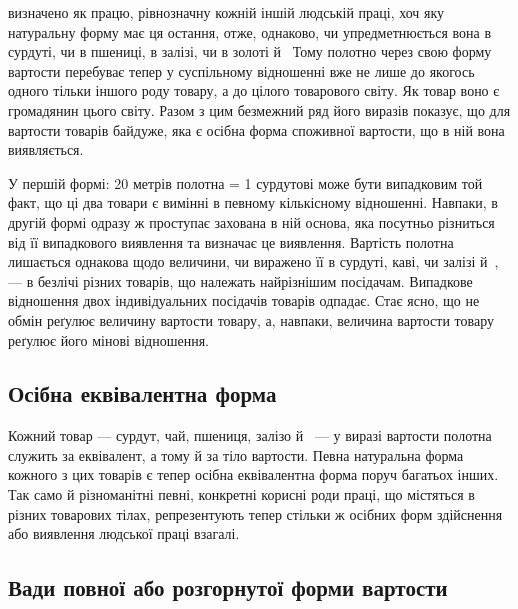 \parcont{}  %
визначено як працю, рівнозначну кожній іншій людській праці,
хоч яку натуральну форму має ця остання, отже, однаково, чи
упредметнюється вона в сурдуті, чи в пшениці, в залізі, чи в
золоті й~ Тому полотно через свою форму вартости перебуває
тепер у суспільному відношенні вже не лише до якогось одного
тільки іншого роду товару, а до цілого товарового світу. Як
товар воно є громадянин цього світу. Разом з цим безмежний ряд
його виразів показує, що для вартости товарів байдуже, яка є
осібна форма споживної вартости, що в ній вона виявляється.

У першій формі: 20 метрів полотна = 1 сурдутові може бути
випадковим той факт, що ці два товари є вимінні в певному кількісному
відношенні. Навпаки, в другій формі одразу ж проступає
захована в ній основа, яка посутньо різниться від її випадкового
виявлення та визначає це виявлення. Вартість полотна лишається
однакова щодо величини, чи виражено її в сурдуті, каві, чи
залізі й~, — в безлічі різних товарів, що належать найрізнішим
посідачам. Випадкове відношення двох індивідуальних посідачів
товарів одпадає. Стає ясно, що не обмін реґулює величину
вартости товару, а, навпаки, величина вартости товару реґулює
його мінові відношення.

\subsection{Осібна еквівалентна форма}

Кожний товар — сурдут, чай, пшениця, залізо й~ — у
виразі вартости полотна служить за еквівалент, а тому й за тіло
вартости. Певна натуральна форма кожного з цих товарів є тепер
осібна еквівалентна форма поруч багатьох інших. Так само й
різноманітні певні, конкретні корисні роди праці, що містяться
в різних товарових тілах, репрезентують тепер стільки ж осібних
форм здійснення або виявлення людської праці взагалі.

\subsection{Вади повної або розгорнутої форми вартости}

